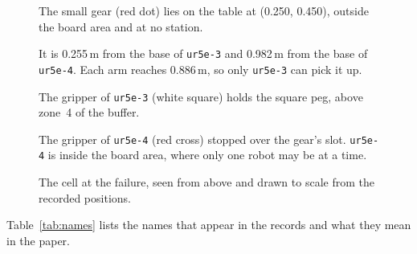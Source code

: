 \documentclass[preprint,12pt,authoryear]{elsarticle}
\let\code\nolinkurl
\begin{document}
\begin{figure}[H]
\begin{minipage}[c]{0.47\linewidth}
\end{minipage}\hfill
\begin{minipage}[c]{0.50\linewidth}
\footnotesize\raggedright
The small gear (red dot) lies on the table at (0.250, 0.450), outside the board area and at
no station.\par\smallskip
It is 0.255\,m from the base of \code{ur5e-3} and 0.982\,m from the base of \code{ur5e-4}.
Each arm reaches 0.886\,m, so only \code{ur5e-3} can pick it up.\par\smallskip
The gripper of \code{ur5e-3} (white square) holds the square peg, above zone~4 of the
buffer.\par\smallskip
The gripper of \code{ur5e-4} (red cross) stopped over the gear's slot. \code{ur5e-4} is
inside the board area, where only one robot may be at a time.
\end{minipage}
\caption{The cell at the failure, seen from above and drawn to scale from the recorded positions.}
\label{fig:scene}
\end{figure}

Table~\ref{tab:names} lists the names that appear in the records and what they mean in the paper.
\end{document}

